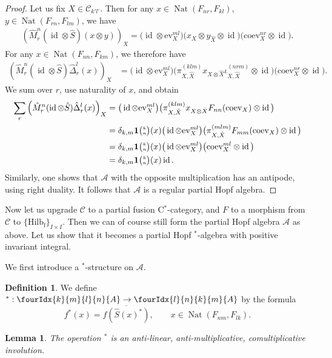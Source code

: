 \documentclass[10pt]{article}
\DeclareMathOperator{\fin}{\mathrm{f}}
\DeclareMathOperator{\id}{id}
\DeclareMathOperator{\Nat}{\mathrm{Nat}}
\newcommand{\CatCC}{\mathscr{C}}
\newcommand{\Hilb}{\mathrm{Hilb}}
\newcommand{\ev}{\mathrm{ev}}
\newcommand{\coev}{\mathrm{coev}}
\newcommand{\Grt}[3]{#1{\tiny {\begin{pmatrix} #2\\#3\end{pmatrix}}}}
\newcommand{\UnitC}[2]{\Grt{\mathbf{1}}{#1}{#2}}
\newcommand{\Gr}[5]{\fourIdx{#2}{#4}{#3}{#5}{#1}}%
\newtheorem{Lem}[Theorem]{Lemma}
\theoremstyle{definition}
\newtheorem{Def}[Theorem]{Definition}
\numberwithin{equation}{section}
\begin{document}
\begin{proof}
Let us fix $X\in \mathcal{C}_{k'l'}$. Then for any $x\in
\Nat(F_{nr},F_{kl})$, $y\in \Nat(F_{rn},F_{lm})$, we have
\begin{align*}
  \left(\hat{M}^n_r(\id\otimes \hat{S})(x\otimes y)\right)_X =
\big(\id \otimes \ev_{X}^{ml}\big)  \big(x_{X} \otimes y_{\hat X} \otimes \id\big) 
  \big(\coev_{X}^{nr} \otimes \id\big).
\end{align*}
For any $x\in \Nat(F_{nn},F_{km})$, we therefore have
\begin{align*}
  \left(\hat{M}^n_r(\id\otimes \hat{S})\hat\Delta^{l}_{r}(x)\right)_X &=
\big(\id \otimes \ev^{ml}_{X}\big)  \big(\pi^{(klm)}_{X,\hat X}x_{X\otimes \hat
    X}\iota^{(nrm)}_{X,\hat X} \otimes \id\big) 
  \big(\coev^{nr}_{X} \otimes \id\big).
\end{align*}
We sum over $r$, use naturality of $x$, and obtain
\begin{align*}
\sum_{r}    \left(\hat{M}^n_r(\id\otimes
  \hat{S})\hat\Delta^{l}_{r}(x)\right)_X &=
\big(\id \otimes \ev_{X}^{ml}\big) \big(\pi^{(klm)}_{X,\hat X}x_{X\otimes \hat
    X}F_{nn}(\coev_{X}) \otimes \id\big) \\
  &=\delta_{k,m} \UnitC{k}{n}(x)
\big(\id \otimes \ev_{X}^{ml}\big) 
\big(\pi^{(mlm)}_{X,\hat X}F_{mm}(\coev_{X})
  \otimes \id\big) \\
  &=\delta_{k,m} \UnitC{k}{n}(x)
\big(\id \otimes \ev_{X}^{ml}\big) 
\big(\coev^{ml}_{X}
  \otimes \id\big) \\
  &= \delta_{k,m} \UnitC{k}{n}(x) \id.
\end{align*}
Similarly, one shows that $\mathscr{A}$ with the opposite multiplication has an antipode, using right duality. It follows that $\mathscr{A}$ is a regular partial Hopf algebra.  
\end{proof} 

Now let us upgrade $\CatCC$ to a partial fusion C$^*$-category, and $F$ to a morphism from $\CatCC$ to $\{\Hilb_{\fin}\}_{I\times I}$. Then we can of course still form the partial Hopf algebra $\mathscr{A}$ as above. Let us show that it becomes a partial Hopf $^*$-algebra with positive invariant integral.

We first introduce a $^*$-structure on $\mathscr{A}$. 

\begin{Def} We define $^*: \Gr{A}{k}{l}{m}{n}\rightarrow \Gr{A}{l}{k}{n}{m}$ by the formula \[f^*(x) = \overline{f(\hat{S}(x)^*)},\qquad x\in \Nat(F_{nm},F_{lk}).\]
\end{Def}

\begin{Lem} The operation $^*$ is an anti-linear, anti-multiplicative, comultiplicative involution.
\end{Lem}
\end{document}
